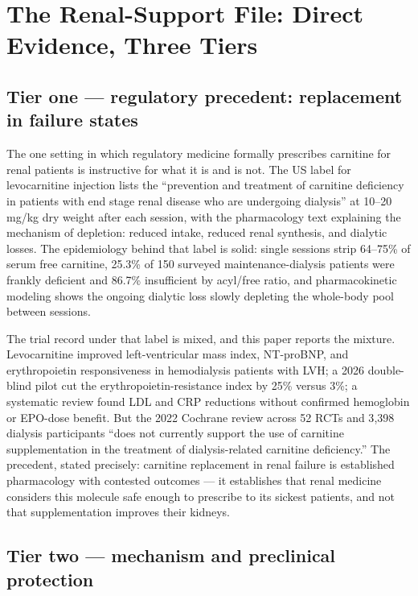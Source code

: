 
\section{The Renal-Support File: Direct Evidence, Three Tiers}
\label{sec:support}

\subsection{Tier one --- regulatory precedent: replacement in failure states}

The one setting in which regulatory medicine formally prescribes carnitine for renal patients is instructive for what it is and is not. The US label for levocarnitine injection lists the ``prevention and treatment of carnitine deficiency in patients with end stage renal disease who are undergoing dialysis'' at 10--20 mg/kg dry weight after each session, with the pharmacology text explaining the mechanism of depletion: reduced intake, reduced renal synthesis, and dialytic losses. The epidemiology behind that label is solid: single sessions strip 64--75\% of serum free carnitine, 25.3\% of 150 surveyed maintenance-dialysis patients were frankly deficient and 86.7\% insufficient by acyl/free ratio, and pharmacokinetic modeling shows the ongoing dialytic loss slowly depleting the whole-body pool between sessions.

The trial record under that label is mixed, and this paper reports the mixture. Levocarnitine improved left-ventricular mass index, NT-proBNP, and erythropoietin responsiveness in hemodialysis patients with LVH; a 2026 double-blind pilot cut the erythropoietin-resistance index by 25\% versus 3\%; a systematic review found LDL and CRP reductions without confirmed hemoglobin or EPO-dose benefit. But the 2022 Cochrane review across 52 RCTs and 3{,}398 dialysis participants ``does not currently support the use of carnitine supplementation in the treatment of dialysis-related carnitine deficiency.'' The precedent, stated precisely: carnitine replacement in renal failure is established pharmacology with contested outcomes --- it establishes that renal medicine considers this molecule safe enough to prescribe to its sickest patients, and not that supplementation improves their kidneys.

\subsection{Tier two --- mechanism and preclinical protection}

